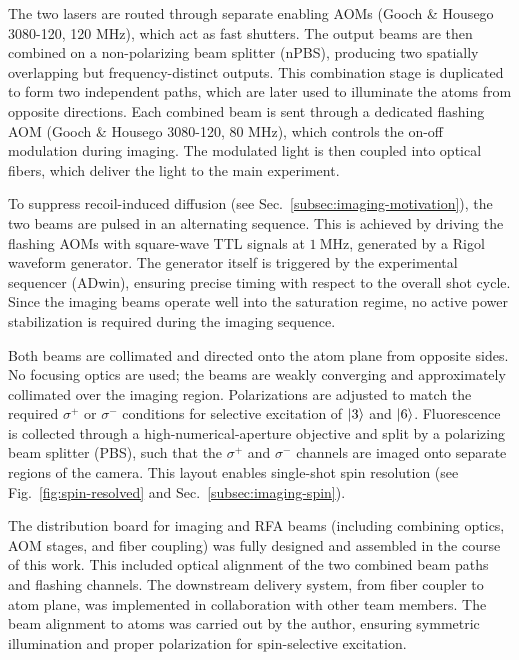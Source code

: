The two lasers are routed through separate enabling AOMs (Gooch \& Housego 3080-120, 120 MHz), which act as fast shutters. The output beams are then combined on a non-polarizing beam splitter (nPBS), producing two spatially overlapping but frequency-distinct outputs. This combination stage is duplicated to form two independent paths, which are later used to illuminate the atoms from opposite directions. Each combined beam is sent through a dedicated flashing AOM (Gooch \& Housego 3080-120, 80 MHz), which controls the on-off modulation during imaging. The modulated light is then coupled into optical fibers, which deliver the light to the main experiment.

To suppress recoil-induced diffusion (see Sec.~\ref{subsec:imaging-motivation}), the two beams are pulsed in an alternating sequence. This is achieved by driving the flashing AOMs with square-wave TTL signals at $1~\mathrm{MHz}$, generated by a Rigol waveform generator. The generator itself is triggered by the experimental sequencer (ADwin), ensuring precise timing with respect to the overall shot cycle. Since the imaging beams operate well into the saturation regime, no active power stabilization is required during the imaging sequence.

Both beams are collimated and directed onto the atom plane from opposite sides. No focusing optics are used; the beams are weakly converging and approximately collimated over the imaging region. Polarizations are adjusted to match the required $\sigma^+$ or $\sigma^-$ conditions for selective excitation of $\left| 3 \right\rangle$ and $\left| 6 \right\rangle$. Fluorescence is collected through a high-numerical-aperture objective and split by a polarizing beam splitter (PBS), such that the $\sigma^+$ and $\sigma^-$ channels are imaged onto separate regions of the camera. This layout enables single-shot spin resolution (see Fig.~\ref{fig:spin-resolved} and Sec.~\ref{subsec:imaging-spin}).

The distribution board for imaging and RFA beams (including combining optics, AOM stages, and fiber coupling) was fully designed and assembled in the course of this work. This included optical alignment of the two combined beam paths and flashing channels. The downstream delivery system, from fiber coupler to atom plane, was implemented in collaboration with other team members. The beam alignment to atoms was carried out by the author, ensuring symmetric illumination and proper polarization for spin-selective excitation.
